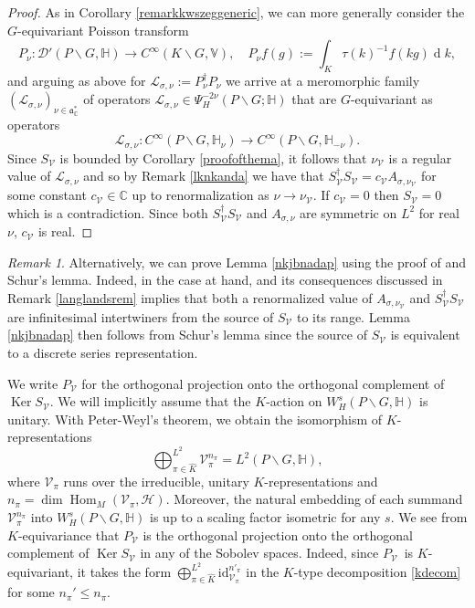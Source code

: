 \documentclass[a4paper,reqno]{amsart}
\numberwithin{equation}{section}
\def\Hom{\operatorname{Hom}}
\def\ker{\operatorname{Ker}}
\def\dim{\operatorname{dim}}
\def\rd{\operatorname{d}\!}
\def\C{\mathbb{C}}
\theoremstyle{definition}
\theoremstyle{remark}
\newtheorem{remark}[thm]{Remark}
\begin{document}
\begin{proof}
As in Corollary \ref{remarkkwszeggeneric}, we can more generally consider the $G$-equivariant Poisson transform 
$$
P_\nu:\mathcal{D}'(P\backslash G,\mathbb{H})\to C^\infty(K\backslash G,\mathbb{V}), \quad P_\nu f(g):=\int_K \tau(k)^{-1} f(kg)\rd k,
$$
and arguing as above for $\mathcal{L}_{\sigma,\nu}:=P_\nu^\dagger P_\nu$ we arrive at a meromorphic family $(\mathcal{L}_{\sigma,\nu})_{\nu\in \mathfrak{a}_\C^*}$ of operators $\mathcal{L}_{\sigma,\nu}\in \Psi^{-2\nu}_H(P\backslash G; \mathbb{H})$ that are $G$-equivariant as operators 
$$\mathcal{L}_{\sigma,\nu}:C^\infty(P\backslash G,\mathbb{H}_\nu)\to C^\infty(P\backslash G,\mathbb{H}_{-\nu}).$$
Since $S_{\mathcal{V}}$ is bounded by Corollary \ref{proofofthema}, it follows that $\nu_\mathcal{V}$ is a regular value of $\mathcal{L}_{\sigma,\nu}$ and so by Remark \ref{lknkanda} we have that $S_{\mathcal{V}}^\dagger S_{\mathcal{V}}=c_{\mathcal{V}}A_{\sigma,\nu_{\mathcal{V}}}$ for some constant $c_{\mathcal{V}}\in \C$ up to renormalization as $\nu\to \nu_{\mathcal{V}}$. If $c_{\mathcal{V}}=0$ then $S_{\mathcal{V}}=0$ which is a contradiction. Since both $S_{\mathcal{V}}^\dagger S_{\mathcal{V}}$ and $A_{\sigma,\nu}$ are symmetric on $L^2$ for real $\nu$, $c_{\mathcal{V}}$ is real.
\end{proof}

\begin{remark}
Alternatively, we can prove Lemma \ref{nkjbnadap} using the proof of \cite[Theorem 14.92]{knappbook} and Schur's lemma. Indeed, in the case at hand, \cite[Theorem 14.92]{knappbook} and its consequences discussed in Remark \ref{langlandsrem} implies that both a renormalized value of $A_{\sigma,\nu_\mathcal{V}}$ and $S_{\mathcal{V}}^\dagger S_{\mathcal{V}}$ are infinitesimal intertwiners from the source of $S_{\mathcal{V}}$ to its range. Lemma \ref{nkjbnadap} then follows from Schur's lemma since the source of $S_{\mathcal{V}}$ is equivalent to a discrete series representation.
\end{remark}

We write $P_{\mathcal{V}}$ for the orthogonal projection onto the orthogonal complement of $\ker S_{\mathcal{V}}$. We will implicitly assume that the $K$-action on $W^s_H(P\backslash G,\mathbb{H})$ is unitary. With Peter-Weyl's theorem, we obtain the isomorphism of $K$-representations 
\begin{equation}
\label{kdecom}
\bigoplus_{\pi\in \hat{K}}^{L^2}\mathcal{V}_\pi^{n_\pi}= L^2(P\backslash G,\mathbb{H}),
\end{equation}
where $\mathcal{V}_\pi$ runs over the irreducible, unitary $K$-representations and $n_\pi=\dim \Hom_M(\mathcal{V}_\pi,\mathcal{H})$. Moreover, the natural embedding of each summand $\mathcal{V}_\pi^{n_\pi}$ into $W^s_H(P\backslash G,\mathbb{H})$ is up to a scaling factor isometric for any $s$. We see from $K$-equivariance that $P_{\mathcal{V}}$ is the orthogonal projection onto the orthogonal complement of $\ker S_{\mathcal{V}}$ in any of the Sobolev spaces. Indeed, since  $P_{\mathcal{V}}$ is $K$-equivariant, it takes the form $\bigoplus_{\pi\in \hat{K}}^{L^2}\mathrm{id}_{\mathcal{V}_\pi}^{n'_\pi}$ in the $K$-type decomposition \eqref{kdecom} for some $n_\pi'\leq n_\pi$.
\end{document}

